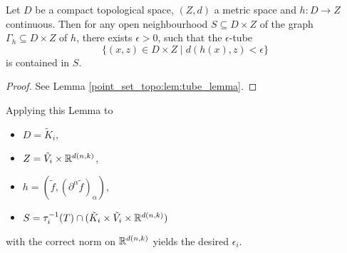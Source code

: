 \begin{lemma}
    Let $D$ be a compact topological space, $(Z,d)$ a metric space and $h \colon D \to Z$ continuous. Then for any open neighbourhood $S \subseteq D \times Z$ of the graph $\Gamma_h \subseteq D \times Z$ of $h$, there exists $\epsilon >0$, such that the $\epsilon$-tube 
    \[
    \{
        (x,z) \in D \times Z \mid d(h(x),z) < \epsilon
    \}
    \]
    is contained in $S$.
\end{lemma}

\begin{proof}
    See Lemma \ref{point_set_topo:lem:tube_lemma}.
\end{proof}
\noindent Applying this Lemma to 
\begin{itemize}
\item $D = \tilde{K}_i$,
\item $Z=\tilde{V}_i \times \mathbb{R}^{d(n,k)}$,
\item $h = (\tilde{f}, (\partial^\alpha\tilde{f})_\alpha)$,
\item $S = \tau_i^{-1}(T) \cap (\tilde{K}_i \times \tilde{V}_i \times \mathbb{R}^{d(n,k)})$
\end{itemize}
with the correct norm on $\mathbb{R}^{d(n,k)}$ yields the desired $\epsilon_i$.